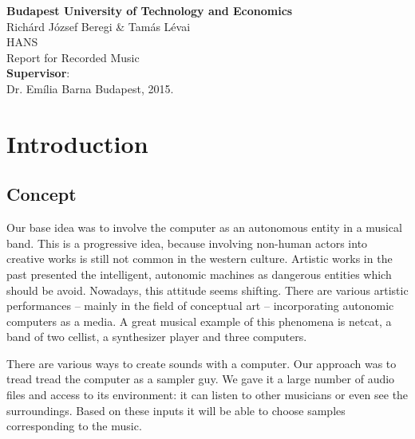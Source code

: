 \documentclass[12pt,a4paper,oneside]{report}
\begin{document}
\begin{titlepage}
{ \center {}
\vspace{0.5cm}

{\large \bf Budapest University of Technology and Economics} \\[10pt]
\vfill
{\Large Richárd József Beregi \& Tamás Lévai} \\[20pt]
{\LARGE HANS} \\[20pt]
{\Large Report for Recorded Music} \\[20pt]
\vfill
{\bf Supervisor}:\\[20pt]

Dr. Emília Barna
\vfill
{\Large Budapest, 2015.}

}
\end{titlepage}

\section*{Introduction}

\subsection*{Concept}
Our base idea was to involve the computer as an autonomous entity in a
musical band. This is a progressive idea, because involving non-human
actors into creative works is still not common in the western
culture. Artistic works in the past presented the intelligent,
autonomic machines as dangerous entities which should be
avoid. Nowadays, this attitude seems shifting. There are various
artistic performances -- mainly in the field of conceptual art --
incorporating autonomic computers as a media. A great musical example
of this phenomena is netcat, a band of two cellist, a synthesizer
player and three computers.

There are various ways to create sounds with a computer. Our approach
was to tread tread the computer as a sampler guy. We gave it a large
number of audio files and access to its environment: it can listen to
other musicians or even see the surroundings. Based on these inputs it
will be able to choose samples corresponding to the music.
\end{document}
